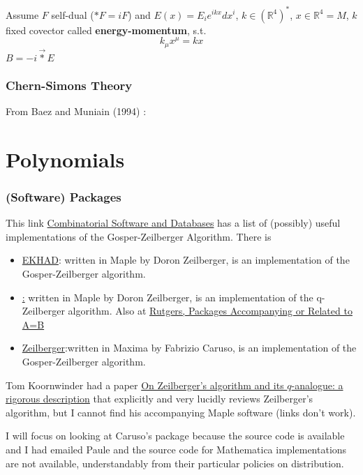 \documentclass[10pt]{amsart}
\begin{document}
\begin{multicols*}{2}
Assume $F$ self-dual ($*F = iF$) and $E(x) = E_i e^{ikx} dx^i$, $k \in (\mathbb{R}^4)^*$, $x\in \mathbb{R}^4 = M$, $k$ fixed covector called \textbf{energy-momentum}, s.t. 
\[
k_{\mu} x^{\mu} = kx
\]
$B= -i \vec{*} E$




\section{Chern-Simons Theory}

From Baez and Muniain (1994) \cite{JBaezJMuniain1994}: 




\part{Polynomials}

\section{(Software) Packages}

This link \href{http://www.mat.univie.ac.at/~slc/divers/software.html}{Combinatorial Software and Databases} has a list of (possibly) useful implementations of the Gosper-Zeilberger Algorithm.  There is 
\begin{itemize}
\item \href{http://www.math.rutgers.edu/~zeilberg/tokhniot/EKHAD}{EKHAD}: written in Maple by Doron Zeilberger, is an implementation of the Gosper-Zeilberger algorithm.
\item \href{http://www.math.rutgers.edu/~zeilberg/tokhniot/qEKHAD}: written in Maple by Doron Zeilberger, is an implementation of the q-Zeilberger algorithm.  Also at \href{http://www.math.rutgers.edu/~zeilberg/programsAB.html}{Rutgers, Packages Accompanying or Related to A=B}
\item \href{http://www.risc.uni-linz.ac.at/research/combinat/risc/software/Zeilberger/}{Zeilberger}:written in Maxima by Fabrizio Caruso, is an implementation of the Gosper-Zeilberger algorithm.
\end{itemize}

Tom Koornwinder had a paper \href{https://staff.fnwi.uva.nl/t.h.koornwinder/art/1993/zeilbalgo.pdf}{On Zeilberger’s algorithm and its $q$-analogue: a rigorous description} that explicitly and very lucidly reviews Zeilberger's algorithm, but I cannot find his accompanying Maple software (links don't work).  

I will focus on looking at Caruso's package because the source code is available and I had emailed Paule and the source code for Mathematica implementations are not available, understandably from their particular policies on distribution.


\end{multicols*}
\end{document}
